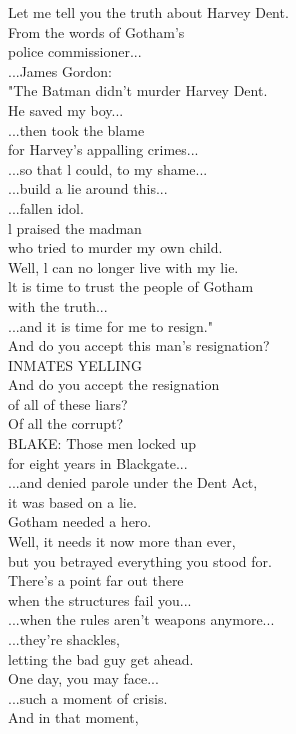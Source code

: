 \documentclass{article}
\begin{document}
\begin{multicols}{3}
Let me tell you the truth about Harvey Dent.\\
From the words of Gotham's\\
police commissioner...\\
...James Gordon:\\
"The Batman didn't murder Harvey Dent.\\
He saved my boy...\\
...then took the blame\\
for Harvey's appalling crimes...\\
...so that l could, to my shame...\\
...build a lie around this...\\
...fallen idol.\\
l praised the madman\\
who tried to murder my own child.\\
Well, l can no longer live with my lie.\\
lt is time to trust the people of Gotham\\
with the truth...\\
...and it is time for me to resign."\\
And do you accept this man's resignation?\\
INMATES YELLING\\
And do you accept the resignation\\
of all of these liars?\\
Of all the corrupt?\\
BLAKE: Those men locked up\\
for eight years in Blackgate...\\
...and denied parole under the Dent Act,\\
it was based on a lie.\\
Gotham needed a hero.\\
Well, it needs it now more than ever,\\
but you betrayed everything you stood for.\\
There's a point far out there\\
when the structures fail you...\\
...when the rules aren't weapons anymore...\\
...they're shackles,\\
letting the bad guy get ahead.\\
One day, you may face...\\
...such a moment of crisis.\\
And in that moment,\\

\end{multicols}
\end{document}

